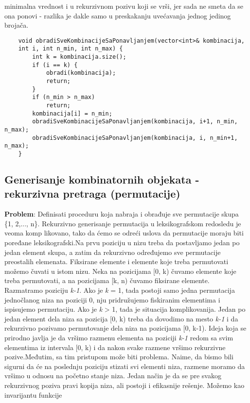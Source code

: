 \documentclass{article}
\begin{document}
minimalna vrednost i u rekurzivnom pozivu koji se vrši, jer sada ne smeta da
se ona ponovi - razlika je dakle samo u preskakanju uvećavanja jednog jedinog
brojača.
\begin{lstlisting}
    void obradiSveKombinacijeSaPonavljanjem(vector<int>& kombinacija, 
    int i, int n_min, int n_max) {
        int k = kombinacija.size();
        if (i == k) {
            obradi(kombinacija);
            return;
        }
        if (n_min > n_max)
            return;
        kombinacija[i] = n_min;
        obradiSveKombinacijeSaPonavljanjem(kombinacija, i+1, n_min, n_max);
        obradiSveKombinacijeSaPonavljanjem(kombinacija, i, n_min+1, n_max);
    }
\end{lstlisting}

\subsection{Generisanje kombinatornih objekata - rekurzivna pretraga (permutacije)}
\textbf{Problem}: Definisati proceduru koja nabraja i obrađuje sve permutacije skupa
\{1, 2,..., n\}.
\newline
Rekurzivno generisanje permutacija u leksikografskom redosledu je veoma komp
likovano, tako da ćemo se odreći uslova da permutacije moraju biti poređane
leksikografski.Na prvu poziciju u nizu
treba da postavljamo jedan po jedan element skupa, a zatim da rekurzivno
određujemo sve permutacije preostalih elemenata. Fiksirane elemente i elemente
koje treba permutovati možemo čuvati u istom nizu. Neka na pozicijama [0, k)
čuvamo elemente koje treba permutovati, a na pozicijama [k, n) čuvamo fiksirane
elemente. Razmatramo poziciju \textit{k-1}. Ako je \textit{k} = 1, tada postoji samo
jedna permutacija jednočlanog niza na poziciji 0, nju pridružujemo fiskiranim
elementima i
ispisujemo permutaciju. Ako je \textit{k} > 1, tada je situacija komplikovanija. Jedan
po jedan element dela niza sa pozicija [0, k) treba da dovodimo na mesto 
\textit{k-1} i
da rekurzivno pozivamo permutovanje dela niza na pozicijama [0, k-1). Ideja
koja se prirodno javlja je da vršimo razmenu elementa na poziciji \textit{k-1} redom sa
svim elementima iz intervala [0, k) i da nakon svake razmene vršimo rekurzivne
pozive.Međutim, sa tim
pristupom može biti problema. Naime, da bismo bili sigurni da će na poslednju
poziciju stizati svi elementi niza, razmene moramo da vršimo u odnosu na početno
stanje niza. Jedan način je da se pre svakog rekurzivnog poziva pravi kopija
niza, ali postoji i efikasnije rešenje. Možemo kao invarijantu funkcije
\end{document}
